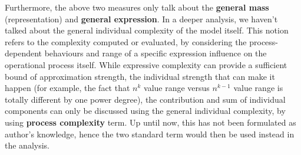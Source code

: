 \documentclass[10pt]{article}
\begin{document}
Furthermore, the above two measures only talk about the \textbf{general mass} (representation) and \textbf{general expression}. In a deeper analysis, we haven't talked about the general individual complexity of the model itself. This notion refers to the complexity computed or evaluated, by considering the process-dependent behaviours and range of a specific expression influence on the operational process itself. While expressive complexity can provide a sufficient bound of approximation strength, the individual strength that can make it happen (for example, the fact that $n^{k}$ value range versus $n^{k-1}$ value range is totally different by one power degree), the contribution and sum of individual components can only be discussed using the general individual complexity, by using \textbf{process complexity} term. Up until now, this has not been formulated as author's knowledge, hence the two standard term would then be used instead in the analysis. 
\end{document}
